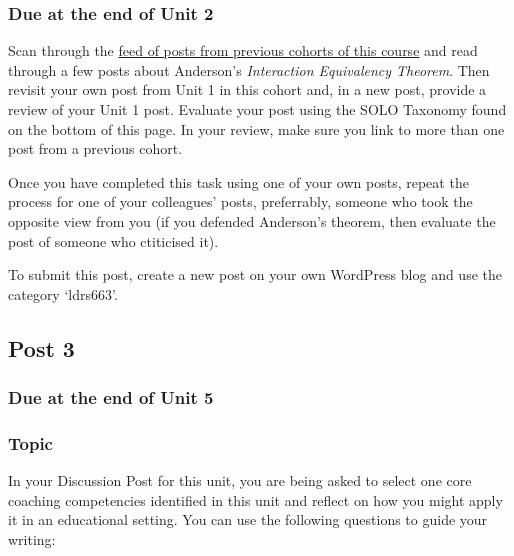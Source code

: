 \documentclass[
]{book}
\begin{document}
\hypertarget{due-at-the-end-of-unit-2}{%
\subsubsection*{Due at the end of Unit 2}\label{due-at-the-end-of-unit-2}}

Scan through the \href{https://ma-lead.github.io/ldrs663/past-blog-feeds.html}{feed of posts from previous cohorts of this course} and read through a few posts about Anderson's \emph{Interaction Equivalency Theorem}. Then revisit your own post from Unit 1 in this cohort and, in a new post, provide a review of your Unit 1 post. Evaluate your post using the SOLO Taxonomy found on the bottom of this page. In your review, make sure you link to more than one post from a previous cohort.

Once you have completed this task using one of your own posts, repeat the process for one of your colleagues' posts, preferrably, someone who took the opposite view from you (if you defended Anderson's theorem, then evaluate the post of someone who ctiticised it).

To submit this post, create a new post on your own WordPress blog and use the category `ldrs663'.

\hypertarget{post-3}{%
\subsection*{Post 3}\label{post-3}}

\hypertarget{due-at-the-end-of-unit-5}{%
\subsubsection*{Due at the end of Unit 5}\label{due-at-the-end-of-unit-5}}

\hypertarget{topic-1}{%
\subsubsection*{Topic}\label{topic-1}}

In your Discussion Post for this unit, you are being asked to select one core coaching competencies identified in this unit and reflect on how you might apply it in an educational setting. You can use the following questions to guide your writing:
\end{document}
